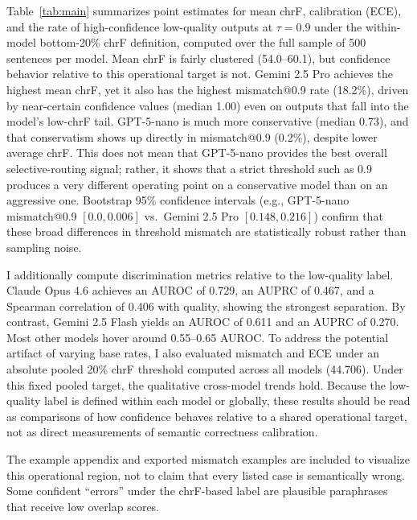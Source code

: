 \documentclass[10pt,conference]{IEEEtran}
\begin{document}
Table~\ref{tab:main} summarizes point estimates for mean chrF, calibration (ECE), and the rate of high-confidence low-quality outputs at $\tau = 0.9$ under the within-model bottom-20\% chrF definition, computed over the full sample of 500 sentences per model. Mean chrF is fairly clustered (54.0--60.1), but confidence behavior relative to this operational target is not. Gemini 2.5 Pro achieves the highest mean chrF, yet it also has the highest mismatch@0.9 rate (18.2\%), driven by near-certain confidence values (median 1.00) even on outputs that fall into the model's low-chrF tail. GPT-5-nano is much more conservative (median 0.73), and that conservatism shows up directly in mismatch@0.9 (0.2\%), despite lower average chrF. This does not mean that GPT-5-nano provides the best overall selective-routing signal; rather, it shows that a strict threshold such as 0.9 produces a very different operating point on a conservative model than on an aggressive one. Bootstrap 95\% confidence intervals (e.g., GPT-5-nano mismatch@0.9 $[0.0, 0.006]$ vs.\ Gemini 2.5 Pro $[0.148, 0.216]$) confirm that these broad differences in threshold mismatch are statistically robust rather than sampling noise.

I additionally compute discrimination metrics relative to the low-quality label. Claude Opus 4.6 achieves an AUROC of 0.729, an AUPRC of 0.467, and a Spearman correlation of 0.406 with quality, showing the strongest separation. By contrast, Gemini 2.5 Flash yields an AUROC of 0.611 and an AUPRC of 0.270. Most other models hover around 0.55--0.65 AUROC. To address the potential artifact of varying base rates, I also evaluated mismatch and ECE under an absolute pooled 20\% chrF threshold computed across all models (44.706). Under this fixed pooled target, the qualitative cross-model trends hold. Because the low-quality label is defined within each model or globally, these results should be read as comparisons of how confidence behaves relative to a shared operational target, not as direct measurements of semantic correctness calibration.

The example appendix and exported mismatch examples are included to visualize this operational region, not to claim that every listed case is semantically wrong. Some confident ``errors'' under the chrF-based label are plausible paraphrases that receive low overlap scores.


\end{document}
